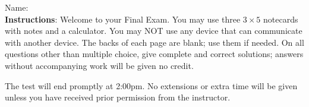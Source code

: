 \documentclass[addpoints]{exam}
\begin{document}
		
\vspace*{0pt}

\noindent
Name: \underline{\hspace{2in}} \\


\noindent
\textbf{Instructions}: Welcome to your Final Exam. You may use three $3 \times 5$ notecards with notes and a calculator. You may NOT use any device that can communicate  with another device. The backs of each page are blank; use them if needed. On all questions other than multiple choice, give complete and correct solutions; answers without accompanying work will be given no credit. 

The test will end promptly at 2:00pm. No extensions or extra time will be given unless you have received prior permission from the instructor.
\end{document}
